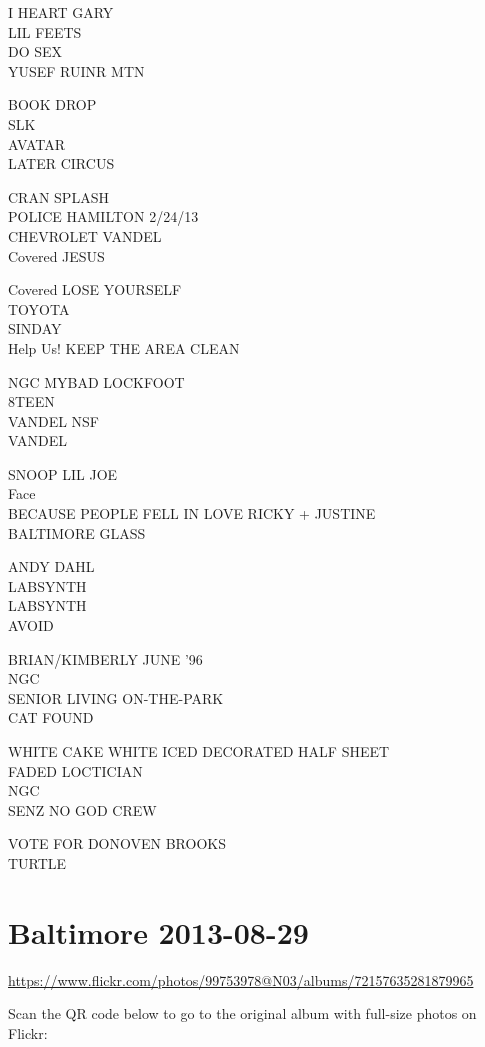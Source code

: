 \documentclass[10pt,letterpaper]{article}
\begin{document}
I HEART GARY\\
LIL FEETS\\
DO SEX\\
YUSEF RUINR MTN

BOOK DROP\\
SLK\\
AVATAR\\
LATER CIRCUS

CRAN SPLASH\\
POLICE HAMILTON 2/24/13\\
CHEVROLET VANDEL\\
Covered JESUS

Covered LOSE YOURSELF\\
TOYOTA\\
SINDAY\\
Help Us! KEEP THE AREA CLEAN

NGC MYBAD LOCKFOOT\\
8TEEN\\
VANDEL NSF\\
VANDEL

SNOOP LIL JOE\\
Face\\
BECAUSE PEOPLE FELL IN LOVE RICKY + JUSTINE\\
BALTIMORE GLASS

ANDY DAHL\\
LABSYNTH\\
LABSYNTH\\
AVOID

BRIAN/KIMBERLY JUNE '96\\
NGC\\
SENIOR LIVING ON{-}THE{-}PARK\\
CAT FOUND

WHITE CAKE WHITE ICED DECORATED HALF SHEET\\
FADED LOCTICIAN\\
NGC\\
SENZ NO GOD CREW

VOTE FOR DONOVEN BROOKS\\
TURTLE


\section*{Baltimore 2013-08-29}

\url{https://www.flickr.com/photos/99753978@N03/albums/72157635281879965}

Scan the QR code below to go to the original album with full-size photos on Flickr:
\end{document}
